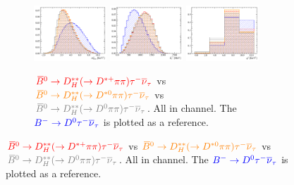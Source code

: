 \begin{figure}[!htb]
    \begin{subfigure}{\textwidth}
        \centering
        \includegraphics[width=0.3\textwidth]{figs-fit-fit-templates/histo-comp/D0_iso_D0Tau__vs__D0_iso_DststHMuDst__vs__D0_iso_DststHMuDst0__vs__D0_iso_DststHMuD0__m2miss.pdf}
        \includegraphics[width=0.3\textwidth]{figs-fit-fit-templates/histo-comp/D0_iso_D0Tau__vs__D0_iso_DststHMuDst__vs__D0_iso_DststHMuDst0__vs__D0_iso_DststHMuD0__el.pdf}
        \includegraphics[width=0.3\textwidth]{figs-fit-fit-templates/histo-comp/D0_iso_D0Tau__vs__D0_iso_DststHMuDst__vs__D0_iso_DststHMuDst0__vs__D0_iso_DststHMuD0__q2.pdf}
        \caption{
            $\textcolor{red}{{{\kern 0.18em\overline{\kern -0.18em B}}{}^0} \rightarrow {\ensuremath{D}}_H^{**} (\rightarrow {\ensuremath{{D}^{*+}}}\pi\pi) {\tau^-}{{\overline{\nu}}_\tau}}$
            vs
            $\textcolor{orange}{{{\kern 0.18em\overline{\kern -0.18em B}}{}^0} \rightarrow {\ensuremath{D}}_H^{**} (\rightarrow {\ensuremath{{D}^{*0}}}\pi\pi) {\tau^-}{{\overline{\nu}}_\tau}}$
            vs
            $\textcolor{gray}{\Bzb \rightarrow \D_H^{**} (\rightarrow \Dz\pi\pi) \taum\neutb}$.
            All in \Dz channel.
            The $\textcolor{blue}{{{{B}^-}} \rightarrow {\ensuremath{{D}^0}}{\ensuremath{\tau^-}}{\ensuremath{{\overline{\nu}}_\tau}}}$ is plotted
            as a reference.
        }
    \end{subfigure}


\end{figure}
